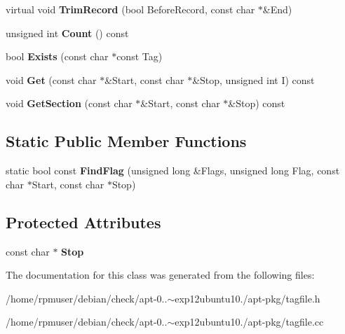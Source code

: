 \begin{DoxyCompactItemize}
\item 
virtual void {\bfseries \-Trim\-Record} (bool \-Before\-Record, const char $\ast$\&\-End)\label{classpkgTagSection_a98566412c061bc3b5b2a8f3470ac6df6}

\item 
unsigned int {\bfseries \-Count} () const \label{classpkgTagSection_a074f9905a87bb9395d21d9f4bc8c459f}

\item 
bool {\bfseries \-Exists} (const char $\ast$const \-Tag)\label{classpkgTagSection_a9e61e13a04ea941007359fc64abaf7e3}

\item 
void {\bfseries \-Get} (const char $\ast$\&\-Start, const char $\ast$\&\-Stop, unsigned int \-I) const \label{classpkgTagSection_af94ab9ae460b12528eff3db24cd1aec9}

\item 
void {\bfseries \-Get\-Section} (const char $\ast$\&\-Start, const char $\ast$\&\-Stop) const \label{classpkgTagSection_a860dc38cfe63d7d9938d4d4dfca89712}

\end{DoxyCompactItemize}
\subsection*{\-Static \-Public \-Member \-Functions}
\begin{DoxyCompactItemize}
\item 
static bool const {\bfseries \-Find\-Flag} (unsigned long \&\-Flags, unsigned long \-Flag, const char $\ast$\-Start, const char $\ast$\-Stop)\label{classpkgTagSection_ac0d8827aa999c7648073f8d708ce746d}

\end{DoxyCompactItemize}
\subsection*{\-Protected \-Attributes}
\begin{DoxyCompactItemize}
\item 
const char $\ast$ {\bfseries \-Stop}\label{classpkgTagSection_a3ea16eea806200f4a86b79bb81fc66cc}

\end{DoxyCompactItemize}


\-The documentation for this class was generated from the following files\-:\begin{DoxyCompactItemize}
\item 
/home/rpmuser/debian/check/apt-\/0..$\sim$exp12ubuntu10./apt-\/pkg/tagfile.\-h\item 
/home/rpmuser/debian/check/apt-\/0..$\sim$exp12ubuntu10./apt-\/pkg/tagfile.\-cc\end{DoxyCompactItemize}
